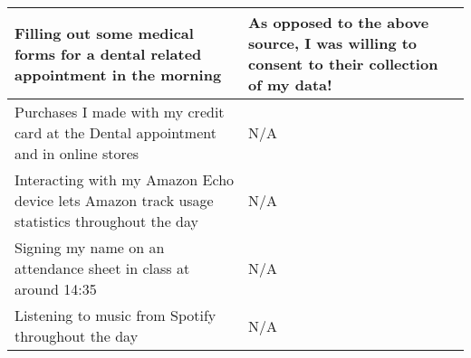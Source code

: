 \documentclass[
  coursecode={CSIC/CMPE 251},
  assignmentname={Exercise 1},
  studentnumber=20053722,
  name={Bryan Hoang}
]{
  ltxanswer%
}
\begin{document}
\begin{questions}
\begin{solution}
\begin{center}
\begin{tabularx}{\textwidth}{
            >{\raggedright\arraybackslash}X
            >{\raggedright\arraybackslash}X}
          \midrule
          Filling out some medical forms for a dental related appointment in the morning                                                                  & As opposed to the above source, I was willing to consent to their collection of my data!                                                                                                                                                                                                                                                                                              \\
          \midrule
          Purchases I made with my credit card at the Dental appointment and in online stores                                                             & N/A                                                                                                                                                                                                                                                                                                                                                                                   \\
          \midrule
          Interacting with my Amazon Echo device lets Amazon track usage statistics throughout the day                                                    & N/A                                                                                                                                                                                                                                                                                                                                                                                   \\
          \midrule
          Signing my name on an attendance sheet in class at around \textapprox{}14:35                                                                    & N/A                                                                                                                                                                                                                                                                                                                                                                                   \\
          \midrule
          Listening to music from Spotify throughout the day                                                                                              & N/A                                                                                                                                                                                                                                                                                                                                                                                   \\

\end{tabularx}
\end{center}
\end{solution}
\end{questions}
\end{document}
